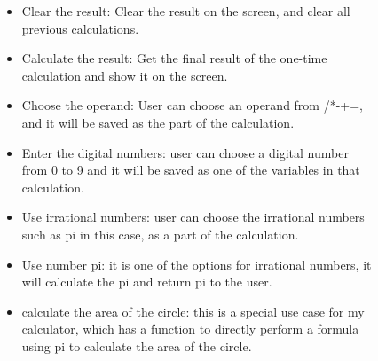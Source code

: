 \documentclass[12pt]{report}
\begin{document}
{\begin{figure}[h!]
\begin{itemize}
  \item Clear the result: Clear the result on the screen, and clear all previous calculations. 
  \item Calculate the result:  Get the final result of the one-time calculation and show it on the screen. 
  \item Choose the operand: User can choose an operand from /*-+=, and it will be saved as the part of the calculation.
  \item Enter the digital numbers: user can choose a digital number from 0 to 9 and it will be saved as one of the variables in that calculation.

  \item Use irrational numbers: user can choose the irrational numbers such as pi in this case, as a part of the calculation.
  \item Use number pi: it is one of the options for irrational numbers, it will calculate the pi and return pi to the user.
  
  \item calculate the area of the circle: this is a special use case for my calculator, which has a function to directly perform a formula using pi to calculate the area of the circle.
  
\end{itemize}

	
	

\end{figure}}
\end{document}
